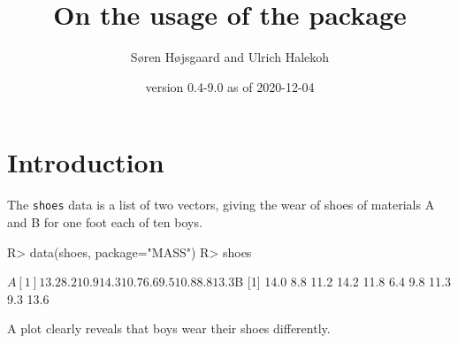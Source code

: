 \documentclass[11pt]{article}
\title{On the usage of the  \pkg{pbkrtest} package}
\author{S{\o}ren H{\o}jsgaard and Ulrich Halekoh}
\date{\pkg{pbkrtest} version 0.4-9.0 as of 2020-12-04}
\def\code#1{{\texttt{#1}}}
\begin{document}


\renewenvironment{Schunk}{\linespread{.90}}{}



\maketitle
\tableofcontents



\section{Introduction}

The \code{shoes} data is a list of two vectors, giving the wear of
shoes of materials A and B for one foot each of ten boys.

\begin{Schunk}
\begin{Sinput}
R> data(shoes, package="MASS")
R> shoes
\end{Sinput}
\begin{Soutput}
$A
 [1] 13.2  8.2 10.9 14.3 10.7  6.6  9.5 10.8  8.8 13.3

$B
 [1] 14.0  8.8 11.2 14.2 11.8  6.4  9.8 11.3  9.3 13.6
\end{Soutput}
\end{Schunk}

A plot clearly reveals that boys wear their shoes differently.
\end{document}
